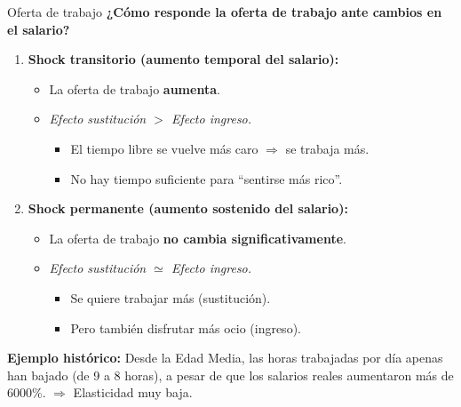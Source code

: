 \documentclass{beamer}
\begin{document}
\begin{frame}{Oferta de trabajo}
\small
\textbf{¿Cómo responde la oferta de trabajo ante cambios en el salario?}
\begin{enumerate}
\item \textbf{Shock transitorio (aumento temporal del salario):}
\begin{itemize}
    \item La oferta de trabajo \textbf{aumenta}.
    \item \textit{Efecto sustitución $>$ Efecto ingreso.}
    \begin{itemize}
        \item El tiempo libre se vuelve más caro $\Rightarrow$ se trabaja más.
        \item No hay tiempo suficiente para “sentirse más rico”.
    \end{itemize}
\end{itemize}

\item \textbf{Shock permanente (aumento sostenido del salario):}
\begin{itemize}
    \item La oferta de trabajo \textbf{no cambia significativamente}.
    \item \textit{Efecto sustitución $\simeq$ Efecto ingreso.}
    \begin{itemize}
        \item Se quiere trabajar más (sustitución).
        \item Pero también disfrutar más ocio (ingreso).
    \end{itemize}
\end{itemize}
\end{enumerate}
\textbf{Ejemplo histórico:}  
Desde la Edad Media, las horas trabajadas por día apenas han bajado (de 9 a 8 horas), a pesar de que los salarios reales aumentaron más de 6000\%. $\Rightarrow$ Elasticidad muy baja.
\end{frame}
\end{document}
